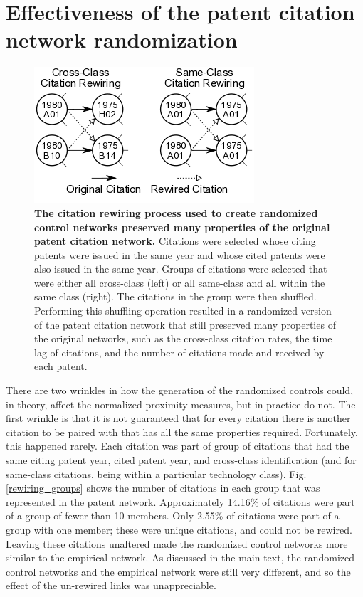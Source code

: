 \documentclass[]{svjour3}
\begin{document}
\section{Effectiveness of the patent citation network randomization}\label{Randomization_effectiveness}
\begin{figure}[h]
\begin{center}
\includegraphics[width=.7\textwidth]{figs/citation_rewiring_diagram_one_column.png} 
\end{center}
\caption{\textbf{The citation rewiring process used to create randomized control networks preserved many properties of the original patent citation network.} Citations were selected whose citing patents were issued in the same year and whose cited patents were also issued in the same year. Groups of citations were selected that were either all cross-class (left) or all same-class and all within the same class (right). The citations in the group were then shuffled. Performing this shuffling operation resulted in a randomized version of the patent citation network that still preserved many properties of the original networks, such as the cross-class citation rates, the time lag of citations, and the number of citations made and received by each patent. }\label{citation_rewiring_diagram}
\end{figure}

There are two wrinkles in how the generation of the randomized controls could, in theory, affect the normalized proximity measures, but in practice do not. The first wrinkle is that it is not guaranteed that for every citation there is another citation to be paired with that has all the same properties required. Fortunately, this happened rarely. Each citation was part of group of citations that had the same citing patent year, cited patent year, and cross-class identification (and for same-class citations, being within a particular technology class). Fig. \ref{rewiring_groups} shows the number of citations in each group that was represented in the patent network. Approximately 14.16\% of citations were part of a group of fewer than 10 members. Only 2.55\% of citations were part of a group with one member; these were unique citations, and could not be rewired. Leaving these citations unaltered made the randomized control networks more similar to the empirical network. As discussed in the main text, the randomized control networks and the empirical network were still very different, and so the effect of the un-rewired links was unappreciable.
\end{document}
